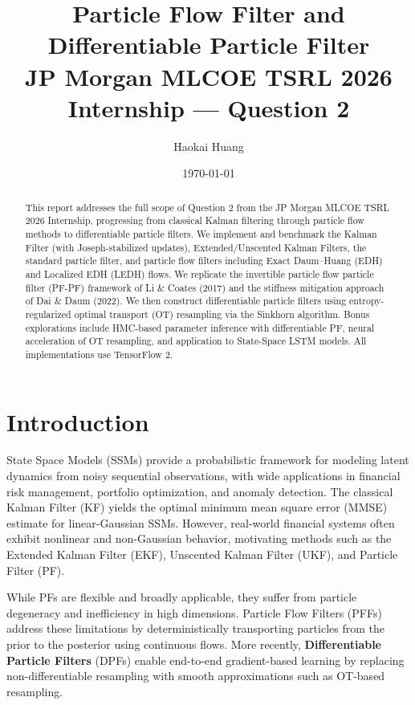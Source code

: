\documentclass[12pt,a4paper]{article}
\title{\textbf{Particle Flow Filter and Differentiable Particle Filter} \\ \large JP Morgan MLCOE TSRL 2026 Internship --- Question 2}
\author{Haokai Huang}
\date{\today}
\theoremstyle{definition}
\theoremstyle{remark}
\begin{document}
\maketitle

\begin{abstract}
This report addresses the full scope of Question 2 from the JP Morgan MLCOE TSRL 2026 Internship, progressing from classical Kalman filtering through particle flow methods to differentiable particle filters. We implement and benchmark the Kalman Filter (with Joseph-stabilized updates), Extended/Unscented Kalman Filters, the standard particle filter, and particle flow filters including Exact Daum--Huang (EDH) and Localized EDH (LEDH) flows. We replicate the invertible particle flow particle filter (PF-PF) framework of Li \& Coates (2017) and the stiffness mitigation approach of Dai \& Daum (2022). We then construct differentiable particle filters using entropy-regularized optimal transport (OT) resampling via the Sinkhorn algorithm. Bonus explorations include HMC-based parameter inference with differentiable PF, neural acceleration of OT resampling, and application to State-Space LSTM models. All implementations use TensorFlow 2.
\end{abstract}

\tableofcontents
\newpage

\section{Introduction}
\label{sec:introduction}

State Space Models (SSMs) provide a probabilistic framework for modeling latent dynamics from noisy sequential observations, with wide applications in financial risk management, portfolio optimization, and anomaly detection. The classical Kalman Filter (KF) yields the optimal minimum mean square error (MMSE) estimate for linear-Gaussian SSMs. However, real-world financial systems often exhibit nonlinear and non-Gaussian behavior, motivating methods such as the Extended Kalman Filter (EKF), Unscented Kalman Filter (UKF), and Particle Filter (PF).

While PFs are flexible and broadly applicable, they suffer from particle degeneracy and inefficiency in high dimensions. Particle Flow Filters (PFFs) address these limitations by deterministically transporting particles from the prior to the posterior using continuous flows. More recently, \textbf{Differentiable Particle Filters} (DPFs) enable end-to-end gradient-based learning by replacing non-differentiable resampling with smooth approximations such as OT-based resampling.
\end{document}
